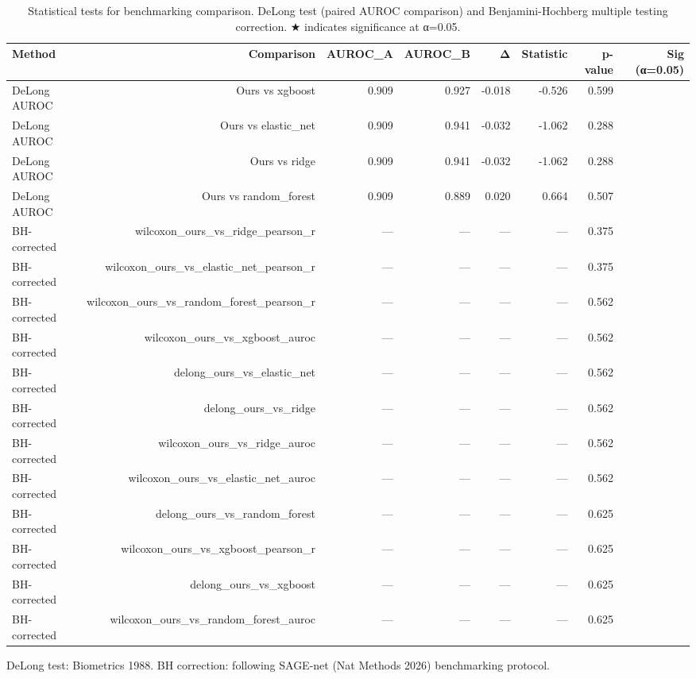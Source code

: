 \begin{table}[htbp]
\centering
\caption{Statistical tests for benchmarking comparison. DeLong test (paired AUROC comparison) and Benjamini-Hochberg multiple testing correction. ★ indicates significance at α=0.05.}
\label{tab:s4_stats}
\small
\begin{tabular}{lrrrrrrr}
\toprule
\textbf{Method} & \textbf{Comparison} & \textbf{AUROC_A} & \textbf{AUROC_B} & \textbf{Δ} & \textbf{Statistic} & \textbf{p-value} & \textbf{Sig (α=0.05)} \\
\midrule
DeLong AUROC & Ours vs xgboost & 0.909 & 0.927 & -0.018 & -0.526 & 0.599 &  \\
DeLong AUROC & Ours vs elastic_net & 0.909 & 0.941 & -0.032 & -1.062 & 0.288 &  \\
DeLong AUROC & Ours vs ridge & 0.909 & 0.941 & -0.032 & -1.062 & 0.288 &  \\
DeLong AUROC & Ours vs random_forest & 0.909 & 0.889 & 0.020 & 0.664 & 0.507 &  \\
BH-corrected & wilcoxon_ours_vs_ridge_pearson_r & — & — & — & — & 0.375 &  \\
BH-corrected & wilcoxon_ours_vs_elastic_net_pearson_r & — & — & — & — & 0.375 &  \\
BH-corrected & wilcoxon_ours_vs_random_forest_pearson_r & — & — & — & — & 0.562 &  \\
BH-corrected & wilcoxon_ours_vs_xgboost_auroc & — & — & — & — & 0.562 &  \\
BH-corrected & delong_ours_vs_elastic_net & — & — & — & — & 0.562 &  \\
BH-corrected & delong_ours_vs_ridge & — & — & — & — & 0.562 &  \\
BH-corrected & wilcoxon_ours_vs_ridge_auroc & — & — & — & — & 0.562 &  \\
BH-corrected & wilcoxon_ours_vs_elastic_net_auroc & — & — & — & — & 0.562 &  \\
BH-corrected & delong_ours_vs_random_forest & — & — & — & — & 0.625 &  \\
BH-corrected & wilcoxon_ours_vs_xgboost_pearson_r & — & — & — & — & 0.625 &  \\
BH-corrected & delong_ours_vs_xgboost & — & — & — & — & 0.625 &  \\
BH-corrected & wilcoxon_ours_vs_random_forest_auroc & — & — & — & — & 0.625 &  \\
\bottomrule
\end{tabular}
\vspace{2pt}
\begin{minipage}{\textwidth}
\footnotesize DeLong test: Biometrics 1988. BH correction: following SAGE-net (Nat Methods 2026) benchmarking protocol.
\end{minipage}
\end{table}